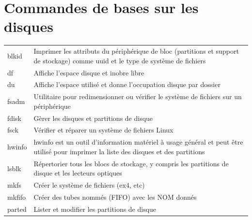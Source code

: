 \documentclass[a4paper, 11pt, french, oneside]{book}
\begin{document}
		\section{Commandes de bases sur les disques}
		    \begin{tabular}{p{3cm}|p{11cm}}
				blkid	& Imprimer les attributs du périphérique de bloc (partitions et support de stockage) comme uuid et le type de système de fichiers\\
				df	& Affiche l’espace disque et inobre libre\\
				du	& Affiche l’espace utilisé et donne l’occupation disque par dossier\\
				fsadm	& Utilitaire pour redimensionner ou vérifier le système de fichiers sur un périphérique\\
				fdisk	& Gèrer les disques et partitions de disque\\
				fsck	& Vérifier et réparer un système de fichiers Linux\\
				hwinfo	& hwinfo est un outil d’information matériel à usage général et peut être utilisé pour imprimer la liste des disques et des partitions\\
				lsblk	& Répertorier tous les blocs de stockage, y compris les partitions de disque et les lecteurs optiques\\
				mkfs	& Créer le système de fichiers (ex4, etc)\\
				mkfifo	& Créer des tubes nommés (FIFO) avec les NOM donnés\\
				parted	& Lister et modifier les partitions de disque\\
			\end{tabular}
\end{document}
